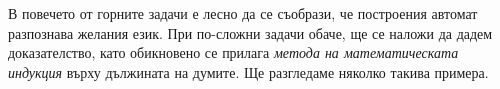 \begin{solution}
\begin{itemize}
\begin{figure}[H]
\begin{center}
      \end{center}
    \end{figure}
  \end{itemize}
\end{solution}

В повечето от горните задачи е лесно да се съобрази, че построения автомат разпознава желания език.
При по-сложни задачи обаче, ще се наложи да дадем доказателство, като обикновено се прилага 
{\em метода на математическата индукция} върху дължината на думите.
Ще разгледаме няколко такива примера.

